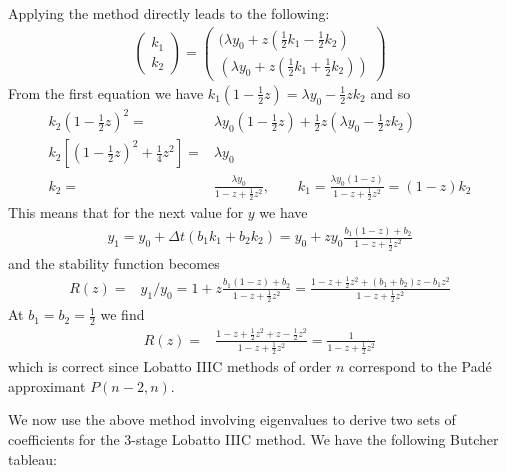 \documentclass[10pt,a4paper]{article}
\newcommand{\half}[0]{\frac{1}{2}}
\begin{document}
Applying the method directly leads to the following:
\begin{align*}
  \begin{pmatrix}
    k_1 \\ k_2
  \end{pmatrix} =  \begin{pmatrix} (\lambda y_0 + z (\half k_1 - \half k_2) \\
    (\lambda y_0 + z(\half k_1 + \half k_2))
    \end{pmatrix}
\end{align*}
From the first equation we have $k_1(1 - \half z) = \lambda y_0 - \half z k_2$ and so
\begin{align*}
  k_2 \left(1 - \half z\right)^2 =& \lambda y_0\left(1 - \half z\right) + \half z \left(\lambda y_0 - \half z k_2\right) \\
  k_2\left[(1 - \half z)^2 + \frac{1}{4}z^2\right] =& \lambda y_0 \\
  k_2 =& \frac{\lambda y_0}{1 - z + \half z^2}, \qquad k_1 = \frac{\lambda y_0(1 - z)}{1 - z + \half z^2} = (1-z)k_2
\end{align*}
This means that for the next value for $y$ we have
\begin{align*}
  y_1 = y_0 + \Delta t (b_1k_1 + b_2k_2) = y_0 + z y_0 \frac{b_1(1-z)+b_2}{1 - z + \half z^2}
\end{align*}
and the stability function becomes
\begin{align*}
  R(z) =& y_1/y_0 = 1 + z\frac{b_1(1-z) + b_2}{1 - z + \half z^2} = \frac{1 - z + \half z^2 + (b_1+b_2)z - b_1z^2}{1 - z + \half z^2}
\end{align*}
At $b_1=b_2=\half$ we find
\begin{align*}
  R(z) =&  \frac{1 - z + \half z^2 + z - \half z^2}{1 - z + \half z^2} = \frac{1}{1 - z + \half z^2}
\end{align*}
which is correct since Lobatto IIIC methods of order $n$ correspond to the Pad\'{e} approximant $P(n-2, n).$


We now use the above method involving eigenvalues to derive two sets of coefficients for the 3-stage Lobatto IIIC method. We have the following Butcher tableau:
\end{document}
